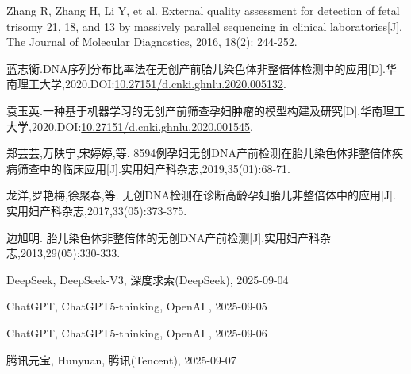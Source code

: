 \documentclass[utf8,12pt]{ctexart}
\begin{document}
\begin{enumerate}[label={[\arabic*]}, leftmargin=*]
    \item Zhang R, Zhang H, Li Y, et al. External quality assessment for detection of fetal trisomy 21, 18, and 13 by massively parallel sequencing in clinical laboratories[J]. The Journal of Molecular Diagnostics, 2016, 18(2): 244-252.
    
    \item 蓝志衡.DNA序列分布比率法在无创产前胎儿染色体非整倍体检测中的应用[D].华南理工大学,2020.DOI:\href{https://doi.org/10.27151/d.cnki.ghnlu.2020.005132}{10.27151/d.cnki.ghnlu.2020.005132}.
    
    \item 袁玉英.一种基于机器学习的无创产前筛查孕妇肿瘤的模型构建及研究[D].华南理工大学,2020.DOI:\href{https://doi.org/10.27151/d.cnki.ghnlu.2020.001545}{10.27151/d.cnki.ghnlu.2020.001545}.
    
    \item 郑芸芸,万陕宁,宋婷婷,等. 8594例孕妇无创DNA产前检测在胎儿染色体非整倍体疾病筛查中的临床应用[J].实用妇产科杂志,2019,35(01):68-71.
    
    \item 龙洋,罗艳梅,徐聚春,等. 无创DNA检测在诊断高龄孕妇胎儿非整倍体中的应用[J].实用妇产科杂志,2017,33(05):373-375.
    
    \item 边旭明. 胎儿染色体非整倍体的无创DNA产前检测[J].实用妇产科杂志,2013,29(05):330-333.
    
    \item DeepSeek, DeepSeek-V3, 深度求索(DeepSeek), 2025-09-04
    
    \item ChatGPT, ChatGPT5-thinking, OpenAI , 2025-09-05

    \item ChatGPT, ChatGPT5-thinking, OpenAI , 2025-09-06

    \item 腾讯元宝, Hunyuan, 腾讯(Tencent), 2025-09-07

\end{enumerate}

\newpage


\end{document}
